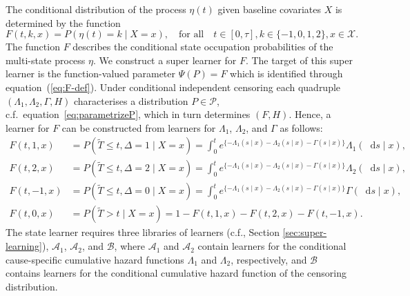 \documentclass[numsec,webpdf,contemporary,medium,namedate]{oup-authoring-template}%
\theoremstyle{thmstyleone}%
\theoremstyle{thmstyletwo}%
\theoremstyle{thmstylethree}%
\newcommand*\diff{\mathop{}\!\mathrm{d}}
\newcommand{\1}{\mathds{1}}
\begin{document}
The conditional distribution of the process \( \eta(t) \) given
baseline covariates \( X \) is determined by the function
\begin{equation}
  \label{eq:F-def}
  F(t, k, x) = P(\eta(t) = k \mid X=x),
  \quad \text{for all} \quad
  t \in [0,\tau],
  k \in \{-1,0,1,2\},
  x \in \mathcal{X}.
\end{equation}
The function \( F \) describes the conditional state occupation
probabilities of the multi-state process \(\eta\). We construct a
super learner for \( F \). The target of this super learner is the
function-valued parameter $\Psi(P) = F$ which is identified through
equation~(\ref{eq:F-def}).
Under conditional independent censoring each quadruple
$(\Lambda_{1}, \Lambda_{2}, \Gamma, H)$ characterises a distribution
\(P\in\mathcal P\), c.f.\ equation~\eqref{eq:parametrizeP}, which in turn
determines \( (F, H) \).
Hence, a learner for \( F \) can be constructed from learners for
\( \Lambda_1 \), \( \Lambda_2 \), and $\Gamma$ as follows:
\begin{equation}\label{eq:transition}
  \begin{split}
  F(t, 1, x)
  & = P(\tilde{T} \leq t, \Delta=1 \mid X=x)
    = \int_0^t e^{\{-\Lambda_{1}(s \mid x)-\Lambda_{2}(s \mid x) - \Gamma(s \mid x)\} }  \Lambda_{1}(\diff s \mid x),
  \\
  F(t, 2, x)
  & = P(\tilde{T} \leq t, \Delta=2 \mid X=x)
    = \int_0^t e^{\{-\Lambda_{1}(s \mid x)-\Lambda_{2}(s \mid x) - \Gamma(s \mid x)\} }  \Lambda_{2}(\diff s \mid x),
  \\
  F(t, -1, x)
  & =
    P(\tilde{T} \leq t, \Delta=0 \mid X=x)
    = \int_0^t e^{\{-\Lambda_{1}(s \mid x)-\Lambda_{2}(s \mid x) - \Gamma(s \mid x)\} }  \Gamma(\diff s \mid x),
  \\
  F(t, 0, x)
  &
    = P(\tilde{T} > t \mid X= x)
    = 1- F(t, 1, x) - F(t, 2, x)- F(t, -1, x).
  \end{split}
\end{equation}
The state learner requires three libraries of learners (c.f., Section \ref{sec:super-learning}),
\(\mathcal{A}_1\), \( \mathcal{A}_2 \), and \( \mathcal{B} \), where
\(\mathcal{A}_1\) and \( \mathcal{A}_2\) contain learners for the
conditional cause-specific cumulative hazard functions \(\Lambda_1\)
and \( \Lambda_2\), respectively, and \(\mathcal{B}\) contains
learners for the conditional cumulative hazard function of the
censoring distribution. %
\end{document}
